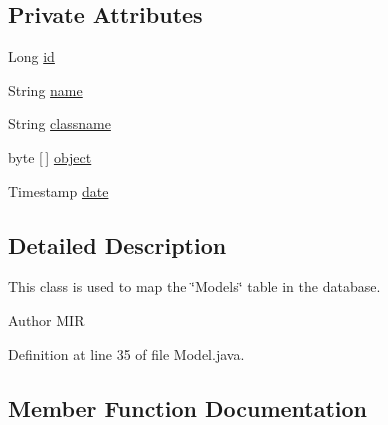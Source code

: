 \subsection*{Private Attributes}
\begin{DoxyCompactItemize}
\item 
Long \hyperlink{classorg_1_1jboss_1_1as_1_1quickstarts_1_1greeter_1_1domain_1_1_model_acee05eab3129c3c3da7d5cc80ea6a2c5}{id}
\item 
String \hyperlink{classorg_1_1jboss_1_1as_1_1quickstarts_1_1greeter_1_1domain_1_1_model_a9e9a3d455bb7e29de4f5f1d28c3b21f1}{name}
\item 
String \hyperlink{classorg_1_1jboss_1_1as_1_1quickstarts_1_1greeter_1_1domain_1_1_model_ad7f79460581991f10f809399af81deed}{classname}
\item 
byte \mbox{[}$\,$\mbox{]} \hyperlink{classorg_1_1jboss_1_1as_1_1quickstarts_1_1greeter_1_1domain_1_1_model_a1c1b50288522353b7e49a08abaa60153}{object}
\item 
Timestamp \hyperlink{classorg_1_1jboss_1_1as_1_1quickstarts_1_1greeter_1_1domain_1_1_model_a133ea828b8b661c399c0046d9f2e6f5c}{date}
\end{DoxyCompactItemize}


\subsection{Detailed Description}
This class is used to map the \char`\"{}\+Models\char`\"{} table in the database. 

\begin{DoxyAuthor}{Author}
M\+IR 
\end{DoxyAuthor}


Definition at line 35 of file Model.\+java.



\subsection{Member Function Documentation}
\mbox{\label{classorg_1_1jboss_1_1as_1_1quickstarts_1_1greeter_1_1domain_1_1_model_a041be61bcc932edf5a1629c4c5b10bbd}} 
